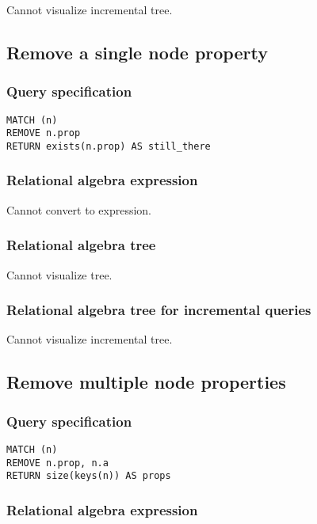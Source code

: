 Cannot visualize incremental tree.

\subsection{Remove a single node property}

\subsubsection*{Query specification}

\begin{lstlisting}
MATCH (n)
REMOVE n.prop
RETURN exists(n.prop) AS still_there
\end{lstlisting}

\subsubsection*{Relational algebra expression}

Cannot convert to expression.

\subsubsection*{Relational algebra tree}

Cannot visualize tree.

\subsubsection*{Relational algebra tree for incremental queries}

Cannot visualize incremental tree.

\subsection{Remove multiple node properties}

\subsubsection*{Query specification}

\begin{lstlisting}
MATCH (n)
REMOVE n.prop, n.a
RETURN size(keys(n)) AS props
\end{lstlisting}

\subsubsection*{Relational algebra expression}

